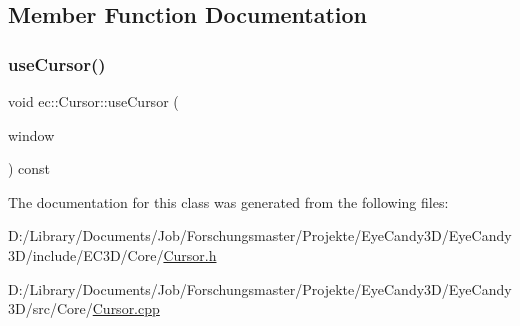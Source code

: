 \subsection{Member Function Documentation}
\mbox{\label{classec_1_1_cursor_ad99efc837c8f7fb348d2ea7c3bd230d4}} 
\subsubsection{\texorpdfstring{use\+Cursor()}{useCursor()}}
{\footnotesize\ttfamily void ec\+::\+Cursor\+::use\+Cursor (\begin{DoxyParamCaption}\item[{G\+L\+F\+Wwindow $\ast$}]{window }\end{DoxyParamCaption}) const}



The documentation for this class was generated from the following files\+:\begin{DoxyCompactItemize}
\item 
D\+:/\+Library/\+Documents/\+Job/\+Forschungsmaster/\+Projekte/\+Eye\+Candy3\+D/\+Eye\+Candy3\+D/include/\+E\+C3\+D/\+Core/\mbox{\hyperlink{_cursor_8h}{Cursor.\+h}}\item 
D\+:/\+Library/\+Documents/\+Job/\+Forschungsmaster/\+Projekte/\+Eye\+Candy3\+D/\+Eye\+Candy3\+D/src/\+Core/\mbox{\hyperlink{_cursor_8cpp}{Cursor.\+cpp}}\end{DoxyCompactItemize}
